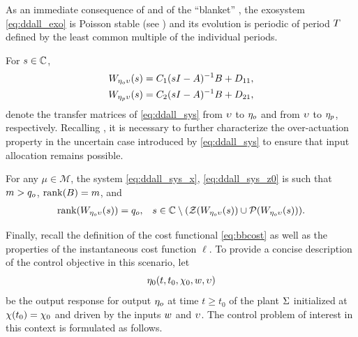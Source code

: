 As an immediate consequence of  and of the ``blanket'' , the exosystem \eqref{eq:ddall_exo} is Poisson stable (see ) and its evolution is periodic of period $T$ defined by the least common multiple of the individual periods.

For $s\in\mathbb{C}$,
\begin{subequations}
	\begin{align}
		W_{\eta_o\upsilon}(s)&=C_1(sI-A)^{-1}B+D_{11}, \label{eq:ddall_W_z0_u}\\
		W_{\eta_p\upsilon}(s)&=C_2(sI-A)^{-1}B+D_{21}, \label{eq:ddall_W_zp_u}
	\end{align}
\end{subequations}
denote the transfer matrices of \eqref{eq:ddall_sys} from $\upsilon$ to $\eta_o$ and from $\upsilon$ to $\eta_p$, respectively. Recalling , it is necessary to further characterize the over-actuation property in the uncertain case introduced by \eqref{eq:ddall_sys} to ensure that input allocation remains possible.
\begin{assumption}
  \label{ass:ddall_redundancy}
  For any $\mu\in\mathcal{M}$, the system \eqref{eq:ddall_sys_x}, \eqref{eq:ddall_sys_z0} is such that $m>{q_o}$, $\operatorname{rank}(B) = m$, and
  \begin{align}
    \operatorname{rank}(W_{\eta_o\upsilon}(s)) &= {q_o}, & s\in\mathbb{C}\setminus(\operatorname{\mathcal{Z}}(W_{\eta_o\upsilon}(s))\cup\operatorname{\mathcal{P}}(W_{\eta_o\upsilon}(s))).
  \end{align}
  \closestatement
\end{assumption}
Finally, recall the definition of the cost functional \eqref{eq:bbcost} as well as the properties of the instantaneous cost function $\ell$. To provide a concise description of the control objective in this scenario, let
\begin{equation}
  \label{ddall:eta0}
  \eta_0(t,t_0,\chi_0,w,\upsilon)
\end{equation}
be the output response for output $\eta_o$ at time $t \geq t_0$ of the plant $\Sigma$ initialized at $\chi(t_0) = \chi_0$ and driven by the inputs $w$ and $\upsilon$. The control problem of interest in this context is formulated as follows.

